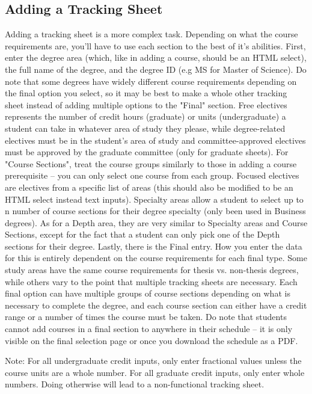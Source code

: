 \documentclass[12pt]{article}
\begin{document}
		\subsection{Adding a Tracking Sheet}
			Adding a tracking sheet is a more complex task. Depending on what the course requirements are, you'll have to use each section to the best of it's abilities. First, enter the degree area (which, like in adding a course, should be an HTML select), the full name of the degree, and the degree ID (e.g MS for Master of Science). Do note that some degrees have widely different course requirements depending on the final option you select, so it may be best to make a whole other tracking sheet instead of adding multiple options to the "Final" section. Free electives represents the number of credit hours (graduate) or units (undergraduate) a student can take in whatever area of study they please, while degree-related electives must be in the student's area of study and committee-approved electives must be approved by the graduate committee (only for graduate sheets). For "Course Sections", treat the course groups similarly to those in adding a course prerequisite -- you can only select one course from each group. Focused electives are electives from a specific list of areas (this should also be modified to be an HTML select instead text inputs). Specialty areas allow a student to select up to n number of course sections for their degree specialty (only been used in Business degrees). As for a Depth area, they are very similar to Specialty areas and Course Sections, except for the fact that a student can only pick one of the Depth sections for their degree. Lastly, there is the Final entry. How you enter the data for this is entirely dependent on the course requirements for each final type. Some study areas have the same course requirements for thesis vs. non-thesis degrees, while others vary to the point that multiple tracking sheets are necessary. Each final option can have multiple groups of course sections depending on what is necessary to complete the degree, and each course section can either have a credit range or a number of times the course must be taken. Do note that students cannot add courses in a final section to anywhere in their schedule -- it is only visible on the final selection page or once you download the schedule as a PDF.
			\par
			Note: For all undergraduate credit inputs, only enter fractional values unless the course units are a whole number. For all graduate credit inputs, only enter whole numbers. Doing otherwise will lead to a non-functional tracking sheet.
			
\end{document}

